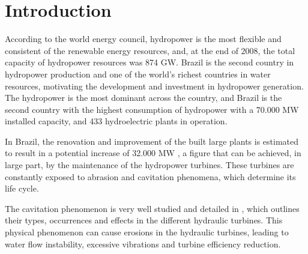 \section{Introduction}
According to the world energy council, hydropower is the most flexible and
consistent of the renewable energy resources, and, at the end of 2008, the total
capacity of hydropower resources was 874 GW. Brazil is the second
country in hydropower production and one of the world's richest countries in
water resources, motivating the development and investment in hydropower
generation. The hydropower is the most dominant across the country, and Brazil
is the second country with the highest consumption of hydropower with a 70.000
MW installed capacity, and 433 hydroelectric plants in operation.


In Brazil, the renovation and improvement of the built large plants is estimated
to result in a potential increase of 32.000 MW \citep{goldemberg2007energia}, a
figure that can be achieved, in large part, by the maintenance of the
hydropower turbines. These turbines are constantly exposed to abrasion and
cavitation phenomena, which determine its life cycle.

The cavitation phenomenon is very well studied and detailed in
\cite{escaler2006detection}, which outlines their types, occurrences and
effects in the different hydraulic turbines. This physical phenomenon can cause
erosions in the hydraulic turbines, leading to water flow instability,
excessive vibrations and turbine efficiency reduction.

